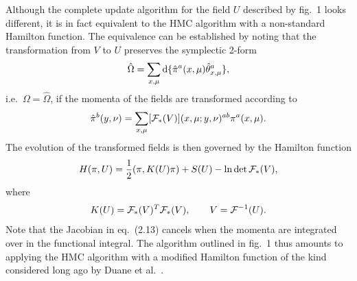 Although the complete update algorithm for the field $U$
described by fig.~1 looks different,
it is in fact equivalent to the HMC algorithm
with a non-standard Hamilton function.
The equivalence can be established by noting
that the transformation from $V$ to $U$
preserves the symplectic 2-form
\begin{equation}
  \hat{\Omega}=
  \sum_{x,\mu}\mathrm{d}\{\hat{\pi}^a(x,\mu)\hat{\theta}^a_{x,\mu}\},
\end{equation}
i.e.\ $\Omega=\hat{\Omega}$,
if the momenta of the fields are transformed according to
\begin{equation}
  \hat{\pi}^b(y,\nu)
  =\sum_{x,\mu}[\mathcal{F}_{*}(V)](x,\mu;y,\nu)^{ab}\pi^a(x,\mu).
\end{equation}
The evolution of the transformed fields
is then governed by the Hamilton function
\begin{equation}
  H(\pi,U)=
  \frac{1}{2}(\pi,K(U)\pi)+
  S(U)-\ln\det\mathcal{F}_{*}(V),
\end{equation}
where
\begin{equation}
  K(U)=\mathcal{F}_{*}(V)^T\mathcal{F}_{*}(V),\qquad V=\mathcal{F}^{-1}(U).
\end{equation}
Note that the Jacobian in eq.~(2.13)
cancels when the momenta are integrated over in the
functional integral.
The algorithm outlined in fig.~1 thus amounts
to applying the HMC algorithm with
a modified Hamilton function
of the kind considered long ago by
Duane et al.~\cite{DuaneEtAl}.
